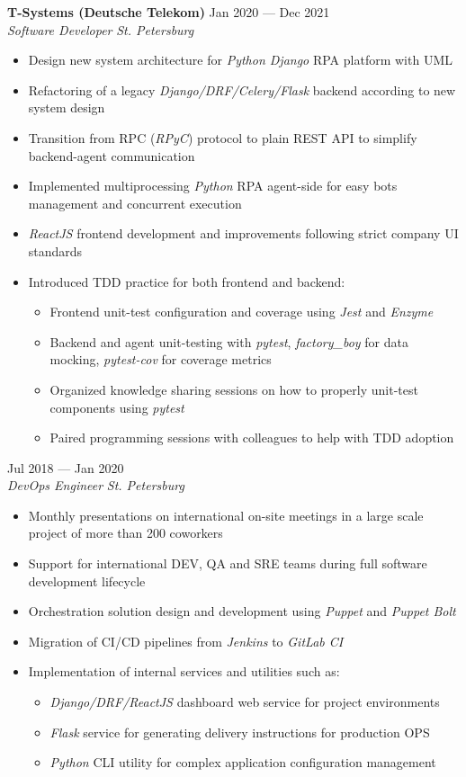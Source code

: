\documentclass[10pt]{report}
\newenvironment{JobDescription}[5]{
    \vspace{ #5 }
    \flushleft
    {\bf #1 } \hfill { #2 }
    \\
    {\em #3 } \hfill {\em #4 }
    \begin{itemize}
} {
    \end{itemize}
}
\begin{document}
\begin{JobDescription}{T-Systems (Deutsche Telekom)}{Jan 2020 --- Dec 2021}{Software Developer}{St. Petersburg}{0mm}
    \item Design new system architecture for \emph{Python Django} RPA platform with UML
    \item Refactoring of a legacy \emph{Django/DRF/Celery/Flask} backend according to new system design
    \item Transition from RPC (\emph{RPyC}) protocol to plain REST API to simplify backend-agent communication
    \item Implemented multiprocessing \emph{Python} RPA agent-side for easy bots management and concurrent execution
    \item \emph{ReactJS} frontend development and improvements following strict company UI standards
    \item Introduced TDD practice for both frontend and backend:
    \begin{itemize}
        \item Frontend unit-test configuration and coverage using \emph{Jest} and \emph{Enzyme}
        \item Backend and agent unit-testing with \emph{pytest}, \emph{factory\_boy} for data mocking, \emph{pytest-cov}
            for coverage metrics
        \item Organized knowledge sharing sessions on how to properly unit-test components using \emph{pytest}
        \item Paired programming sessions with colleagues to help with TDD adoption
    \end{itemize}
\end{JobDescription}

\begin{JobDescription}{}{Jul 2018 --- Jan 2020}{DevOps Engineer}{St. Petersburg}{-3mm}
    \item Monthly presentations on international on-site meetings in a large scale project of more than 200 coworkers
    \item Support for international DEV, QA and SRE teams during full software development lifecycle
    \item Orchestration solution design and development using \emph{Puppet} and \emph{Puppet Bolt}
    \item Migration of CI/CD pipelines from \emph{Jenkins} to \emph{GitLab CI}
    \item Implementation of internal services and utilities such as:
    \begin{itemize}
        \item \emph{Django/DRF/ReactJS} dashboard web service for project environments
        \item \emph{Flask} service for generating delivery instructions for production OPS
        \item \emph{Python} CLI utility for complex application configuration management
    \end{itemize}
\end{JobDescription}
\end{document}
